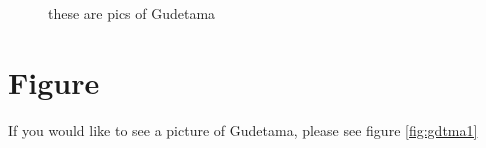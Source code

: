 \documentclass{article}
\begin{document}
\begin{figure}[h] %


\begin{center}
\quad %
\quad
{} 
\caption{these are pics of Gudetama}
\label{fig:gdtma}
\end{center}


\end{figure}


\section{Figure}
If you would like to see a picture of Gudetama, please see figure \ref{fig:gdtma1}
\end{document}
